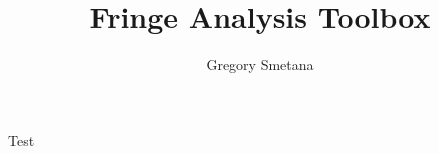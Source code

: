 \documentclass[11pt]{article} %
\title{Fringe Analysis Toolbox}
\author{Gregory Smetana}
\begin{document}
\maketitle
Test
\end{document}
